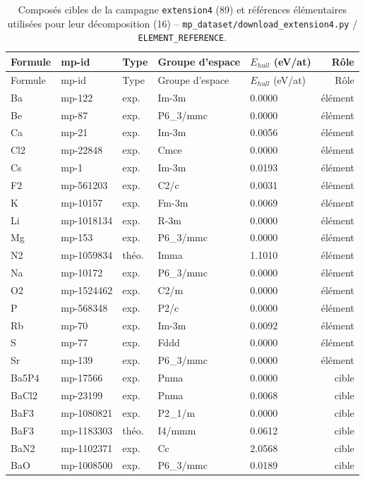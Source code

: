 \begin{longtable}{@{}lllllr@{}}
\caption{Composés cibles de la campagne \texttt{extension4} (89) et références élémentaires utilisées pour leur décomposition (16) -- \texttt{mp\_dataset/download\_extension4.py} / \texttt{ELEMENT\_REFERENCE}.}\\
\toprule
Formule & mp-id & Type & Groupe d'espace & $E_{hull}$ (eV/at) & Rôle \\
\midrule
\endfirsthead
\toprule
Formule & mp-id & Type & Groupe d'espace & $E_{hull}$ (eV/at) & Rôle \\
\midrule
\endhead
\bottomrule
\endfoot
Ba & mp-122 & exp. & Im-3m & 0.0000 & élément \\
Be & mp-87 & exp. & P6\_3/mmc & 0.0000 & élément \\
Ca & mp-21 & exp. & Im-3m & 0.0056 & élément \\
Cl2 & mp-22848 & exp. & Cmce & 0.0000 & élément \\
Cs & mp-1 & exp. & Im-3m & 0.0193 & élément \\
F2 & mp-561203 & exp. & C2/c & 0.0031 & élément \\
K & mp-10157 & exp. & Fm-3m & 0.0069 & élément \\
Li & mp-1018134 & exp. & R-3m & 0.0000 & élément \\
Mg & mp-153 & exp. & P6\_3/mmc & 0.0000 & élément \\
N2 & mp-1059834 & théo. & Imma & 1.1010 & élément \\
Na & mp-10172 & exp. & P6\_3/mmc & 0.0000 & élément \\
O2 & mp-1524462 & exp. & C2/m & 0.0000 & élément \\
P & mp-568348 & exp. & P2/c & 0.0000 & élément \\
Rb & mp-70 & exp. & Im-3m & 0.0092 & élément \\
S & mp-77 & exp. & Fddd & 0.0000 & élément \\
Sr & mp-139 & exp. & P6\_3/mmc & 0.0000 & élément \\
Ba5P4 & mp-17566 & exp. & Pnma & 0.0000 & cible \\
BaCl2 & mp-23199 & exp. & Pnma & 0.0068 & cible \\
BaF3 & mp-1080821 & exp. & P2\_1/m & 0.0000 & cible \\
BaF3 & mp-1183303 & théo. & I4/mmm & 0.0612 & cible \\
BaN2 & mp-1102371 & exp. & Cc & 2.0568 & cible \\
BaO & mp-1008500 & exp. & P6\_3/mmc & 0.0189 & cible \\

\end{longtable}
